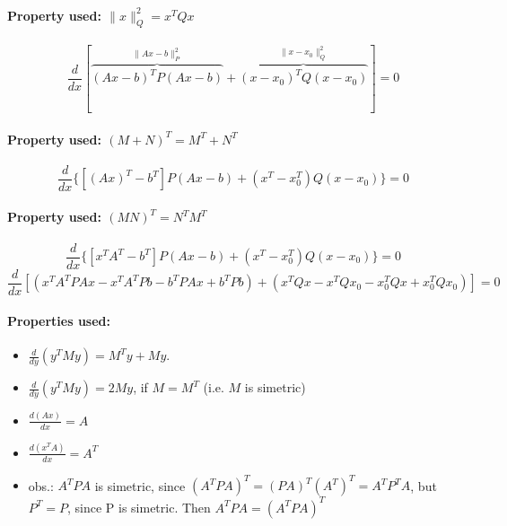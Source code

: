 \documentclass[a4paper]{article}    %
\begin{document}
\paragraph{Property used: $\|x\|_{Q}^{2} = x^{T}Qx$}
    \[\frac{d}{dx} [\overbrace{(Ax-b)^{T} P (Ax-b)}^{\|Ax-b\|_{P}^{2}} + \overbrace{(x-x_0)^T Q (x-x_0)}^{\|x-x_{0}\|_{Q}^{2}}] = 0\]
\paragraph{Property used: $(M + N)^T = M^T + N^T$}
    \[\frac{d}{dx} \{[(Ax)^T-b^T] P (Ax-b) + (x^T-x_0^T) Q (x-x_0)\} = 0\]
\paragraph{Property used: $(MN)^T = N^T M^T$}
    \[\frac{d}{dx} \{[x^TA^T-b^T] P (Ax-b) + (x^T-x_0^T) Q (x-x_0)\} = 0\]
    \[\frac{d}{dx} [(x^TA^TPAx - x^TA^TPb -b^TPAx + b^TPb) + (x^TQx - x^TQx_0 - x_0^TQx + x_0^TQx_0)] = 0\]
\paragraph{Properties used:}
    \begin{itemize}
        \item $\frac{d}{dy}(y^TMy) = M^Ty + My$.
        \item $\frac{d}{dy}(y^TMy) = 2My$, if $M = M^T$ (i.e. $M$ is simetric)
        \item $\frac{d(Ax)}{dx} = A$
        \item $\frac{d(x^TA)}{dx} = A^T$
        \item obs.: $A^TPA$ is simetric, since $(A^TPA)^T = (PA)^T(A^T)^T = A^TP^TA$, but $P^T = P$, since P is simetric. Then $A^TPA = (A^TPA)^T$
    \end{itemize}
\end{document}
